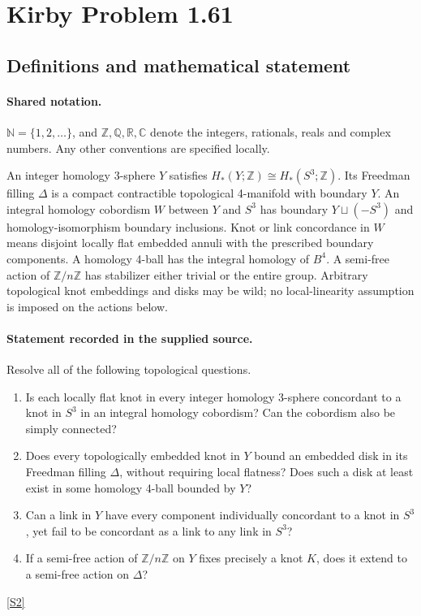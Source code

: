 \documentclass[11pt]{article}
\newcommand{\sref}[2]{\hyperlink{source:#1:#2}{[S#2]}}
\begin{document}
\section{Kirby Problem 1.61}\label{statement}

\subsection{Definitions and mathematical statement}

\paragraph{Shared notation.}$\mathbb N=\{1,2,\ldots\}$, and $\mathbb Z,\mathbb Q,\mathbb R,\mathbb C$ denote the integers, rationals, reals and complex numbers. Any other conventions are specified locally.


An integer homology 3-sphere $Y$ satisfies $H_*(Y;\mathbb Z)\cong H_*(S^3;\mathbb Z)$. Its Freedman filling $\Delta$ is a compact contractible topological 4-manifold with boundary $Y$. An integral homology cobordism $W$ between $Y$ and $S^3$ has boundary $Y\sqcup(-S^3)$ and homology-isomorphism boundary inclusions. Knot or link concordance in $W$ means disjoint locally flat embedded annuli with the prescribed boundary components. A homology 4-ball has the integral homology of $B^4$. A semi-free action of $\mathbb Z/n\mathbb Z$ has stabilizer either trivial or the entire group. Arbitrary topological knot embeddings and disks may be wild; no local-linearity assumption is imposed on the actions below.
\paragraph{Statement recorded in the supplied source.}
Resolve all of the following topological questions.
\begin{enumerate}
\item Is each locally flat knot in every integer homology 3-sphere concordant to a knot in $S^3$ in an integral homology cobordism? Can the cobordism also be simply connected?
\item Does every topologically embedded knot in $Y$ bound an embedded disk in its Freedman filling $\Delta$, without requiring local flatness? Does such a disk at least exist in some homology 4-ball bounded by $Y$?
\item Can a link in $Y$ have every component individually concordant to a knot in $S^3$, yet fail to be concordant as a link to any link in $S^3$?
\item If a semi-free action of $\mathbb Z/n\mathbb Z$ on $Y$ fixes precisely a knot $K$, does it extend to a semi-free action on $\Delta$?
\end{enumerate} \sref{statement}{2}
\end{document}
